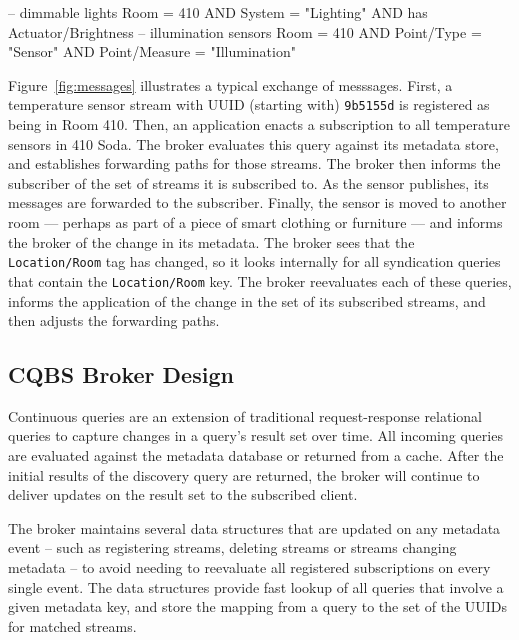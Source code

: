 \begin{minipage}{\linewidth}
\begin{sqlcode}
-- dimmable lights
Room = 410 AND System = "Lighting"
AND has Actuator/Brightness
-- illumination sensors
Room = 410 AND Point/Type = "Sensor"
AND Point/Measure = "Illumination"
\end{sqlcode}
\end{minipage}
\vspace{0.3cm}

Figure~\ref{fig:messages} illustrates a typical exchange of messsages.
First, a temperature sensor stream with UUID (starting with) \texttt{9b5155d} is registered as being in Room 410.
Then, an application enacts a subscription to all temperature sensors in 410 Soda.
The broker evaluates this query against its metadata store, and establishes forwarding paths for those streams.
The broker then informs the subscriber of the set of streams it is subscribed to.
As the sensor publishes, its messages are forwarded to the subscriber.
Finally, the sensor is moved to another room --- perhaps as part of a piece of smart clothing or furniture --- and informs the broker of the change in its metadata.
The broker sees that the \texttt{Location/Room} tag has changed, so it looks internally for all syndication queries that contain the \texttt{Location/Room} key.
The broker reevaluates each of these queries, informs the application of the change in the set of its subscribed streams, and then adjusts the forwarding paths.

\subsection{CQBS Broker Design}

Continuous queries are an extension of traditional request-response relational queries to capture changes in a query's result set over time.
All incoming queries are evaluated against the metadata database or returned from a cache.
After the initial results of the discovery query are returned, the broker will continue to deliver updates on the result set to the subscribed client.

The broker maintains several data structures that are updated on any metadata event -- such as registering streams, deleting streams or streams changing metadata -- to avoid needing to reevaluate all registered subscriptions on every single event.
The data structures provide fast lookup of all queries that involve a given metadata key, and store the mapping from a query to the set of the UUIDs for matched streams.

